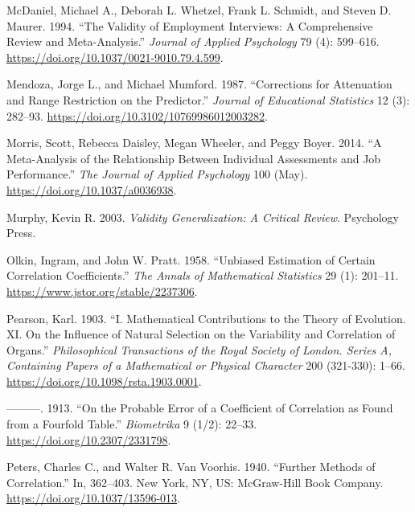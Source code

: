 \documentclass[
  letterpaper,
  DIV=11,
  numbers=noendperiod]{scrreprt}
\newlength{\cslhangindent}
\newlength{\cslentryspacingunit} %
\newenvironment{CSLReferences}[2] %
 {%
  \setlength{\parindent}{0pt}
  \ifodd #1
  \let\oldpar\par
  \def\par{\hangindent=\cslhangindent\oldpar}
  \fi
  \setlength{\parskip}{#2\cslentryspacingunit}
 }%
 {}
\begin{document}
\begin{CSLReferences}{1}{0}
\leavevmode{}%
McDaniel, Michael A., Deborah L. Whetzel, Frank L. Schmidt, and Steven
D. Maurer. 1994. {``The Validity of Employment Interviews: A
Comprehensive Review and Meta-Analysis.''} \emph{Journal of Applied
Psychology} 79 (4): 599--616.
\url{https://doi.org/10.1037/0021-9010.79.4.599}.

\leavevmode{}%
Mendoza, Jorge L., and Michael Mumford. 1987. {``Corrections for
Attenuation and Range Restriction on the Predictor.''} \emph{Journal of
Educational Statistics} 12 (3): 282--93.
\url{https://doi.org/10.3102/10769986012003282}.

\leavevmode{}%
Morris, Scott, Rebecca Daisley, Megan Wheeler, and Peggy Boyer. 2014.
{``A Meta-Analysis of the Relationship Between Individual Assessments
and Job Performance.''} \emph{The Journal of Applied Psychology} 100
(May). \url{https://doi.org/10.1037/a0036938}.

\leavevmode{}%
Murphy, Kevin R. 2003. \emph{Validity Generalization: A Critical
Review}. Psychology Press.

\leavevmode{}%
Olkin, Ingram, and John W. Pratt. 1958. {``Unbiased Estimation of
Certain Correlation Coefficients.''} \emph{The Annals of Mathematical
Statistics} 29 (1): 201--11. \url{https://www.jstor.org/stable/2237306}.

\leavevmode{}%
Pearson, Karl. 1903. {``I. Mathematical Contributions to the Theory of
Evolution. {\textemdash}XI. On the Influence of Natural Selection on the
Variability and Correlation of Organs.''} \emph{Philosophical
Transactions of the Royal Society of London. Series A, Containing Papers
of a Mathematical or Physical Character} 200 (321-330): 1--66.
\url{https://doi.org/10.1098/rsta.1903.0001}.

\leavevmode{}%
---------. 1913. {``On the Probable Error of a Coefficient of
Correlation as Found from a Fourfold Table.''} \emph{Biometrika} 9
(1/2): 22--33. \url{https://doi.org/10.2307/2331798}.

\leavevmode{}%
Peters, Charles C., and Walter R. Van Voorhis. 1940. {``Further Methods
of Correlation.''} In, 362--403. New York, NY, US: McGraw-Hill Book
Company. \url{https://doi.org/10.1037/13596-013}.


\end{CSLReferences}
\end{document}
